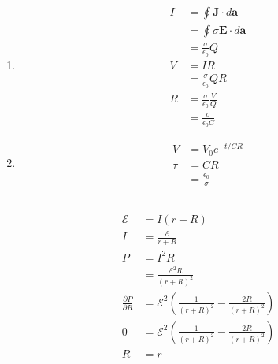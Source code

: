 \documentclass{article}
\renewcommand{\vec}[1]{\boldsymbol{\mathbf{#1}}}
\begin{document}
\begin{enumerate}
  \item

        \begin{align*}
          I & = \oint \vec{J} \cdot d \vec{a}         \\
            & = \oint \sigma \vec{E} \cdot d \vec{a}  \\
            & = \frac{\sigma}{\epsilon_0} Q           \\
          V & = I R                                   \\
            & = \frac{\sigma}{\epsilon_0} Q R         \\
          R & = \frac{\sigma}{\epsilon_0} \frac{V}{Q} \\
            & = \frac{\sigma}{\epsilon_0 C}
        \end{align*}

  \item

        \begin{align*}
          V    & = V_0 e^{-t / C R}          \\
          \tau & = C R                       \\
               & = \frac{\epsilon_0}{\sigma}
        \end{align*}
\end{enumerate}

\setcounter{subsection}{4}
\subsection{}

\begin{align*}
  \mathcal{E}                   & = I (r + R)                                                                \\
  I                             & = \frac{\mathcal{E}}{r + R}                                                \\
  P                             & = I^2 R                                                                    \\
                                & = \frac{\mathcal{E}^2 R}{(r + R)^2}                                        \\
  \frac{\partial P}{\partial R} & = \mathcal{E}^2 \left( \frac{1}{(r + R)^2} - \frac{2 R}{(r + R)^2} \right) \\
  0                             & = \mathcal{E}^2 \left( \frac{1}{(r + R)^2} - \frac{2 R}{(r + R)^2} \right) \\
  R                             & = r
\end{align*}
\end{document}
